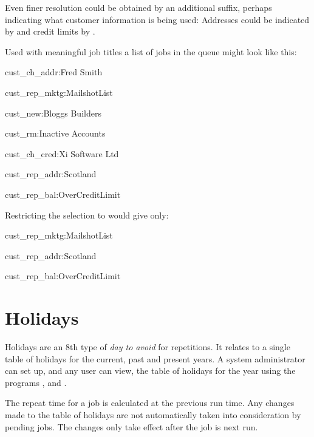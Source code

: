 Even finer resolution could be obtained by an additional suffix, perhaps indicating what customer information is being used: Addresses could be
indicated by  and credit limits by .

Used with meaningful job titles a list of jobs in the queue  might look like this:

\begin{expara}

cust\_ch\_addr:Fred Smith

cust\_rep\_mktg:MailshotList

cust\_new:Bloggs Builders

cust\_rm:Inactive Accounts

cust\_ch\_cred:Xi Software Ltd

cust\_rep\_addr:Scotland

cust\_rep\_bal:OverCreditLimit

\end{expara}

Restricting the selection to  would give only:

\begin{expara}

cust\_rep\_mktg:MailshotList

cust\_rep\_addr:Scotland

cust\_rep\_bal:OverCreditLimit

\end{expara}

\section{Holidays}
Holidays are an 8th type of \textit{day to avoid} for repetitions. It relates to a single table of holidays for the current, past and present
years. A system administrator can set up, and any user can view, the table of holidays for the year using the programs
\PrBtq{}, \PrXbtq{} and \PrXmbtq{}.

The repeat time for a job is calculated at the previous run time. Any changes made to the table of holidays are not automatically taken into
consideration by pending jobs. The changes only take effect after the job is next run.

